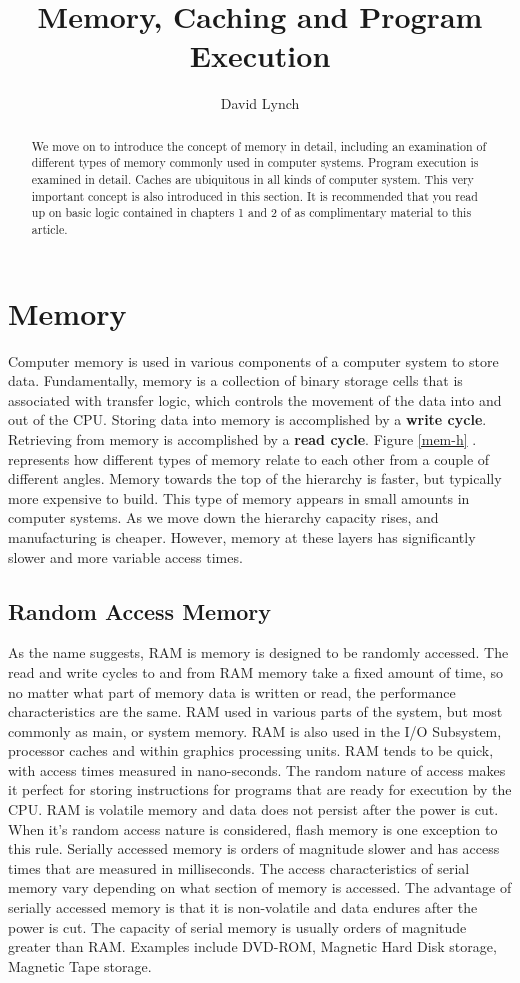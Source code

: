 \documentclass[10pt,a4paper]{article}
\title{Memory, Caching and Program Execution}
\author{David Lynch}
\begin{document}
\maketitle
\begin{abstract}
We move on to introduce the concept of memory in detail, including an examination of different types of memory commonly used in computer systems. Program execution is examined in detail. Caches are ubiquitous in all kinds of computer system. This very important concept is also introduced in this section. It is recommended that you read up on basic logic contained in chapters 1 and 2 of \cite{LOGICDESIGN} as complimentary material to this article. 
\end{abstract}

\section{Memory}
Computer memory is used in various components of a computer system to store data. Fundamentally, memory is a collection of binary storage cells that is associated with transfer logic, which controls the movement of the data into and out of the CPU. Storing data into memory is accomplished by a {\bf write cycle}. Retrieving from memory is accomplished by a {\bf read cycle}. Figure \ref{mem-h} . represents how different types of memory relate to each other from a couple of different angles. Memory towards the top of the hierarchy is faster, but typically more expensive to build. This type of memory appears in small amounts in computer systems. As we move down the hierarchy capacity rises, and manufacturing is cheaper. However, memory at these layers has significantly slower and more variable access times. 
\subsection{Random Access Memory}
As the name suggests, RAM is memory is designed to be randomly accessed. The read and write cycles to and from RAM memory take a fixed amount of time, so no matter what part of memory data is written or read, the performance characteristics are the same. RAM used in various parts of the system, but most commonly as main, or system memory. RAM is also used in the I/O Subsystem, processor caches and within graphics processing units. RAM tends to be quick, with access times measured in nano-seconds. The random nature of access makes it perfect for storing instructions for programs that are ready for execution by the CPU. RAM is volatile memory and data does not persist after the power is cut. When it's random access nature is considered, flash memory is one exception to this rule. 
\newline\newline
Serially accessed memory is orders of magnitude slower and has access times that are measured in milliseconds. The access characteristics of serial memory vary depending on what section of memory is accessed. The advantage of serially accessed memory is that it is non-volatile and data endures after the power is cut. The capacity of serial memory is usually orders of magnitude greater than RAM. Examples include DVD-ROM, Magnetic Hard Disk storage, Magnetic Tape storage. 
\end{document}
